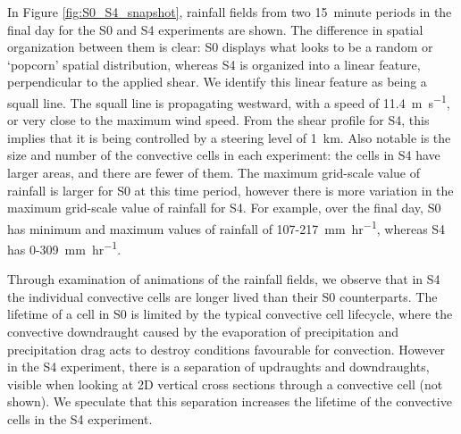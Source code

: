 \documentclass[11pt,a4paper]{article}
\begin{document}
%
In Figure \ref{fig:S0_S4_snapshot}, rainfall fields from two \SI{15}{minute} periods in the final day for the S0 and S4 experiments are shown. The difference in spatial organization between them is clear: S0 displays what looks to be a random or `popcorn' spatial distribution, whereas S4 is organized into a linear feature, perpendicular to the applied shear. We identify this linear feature as being a squall line. The squall line is propagating westward, with a speed of \SI{11.4}{m.s^{-1}}, or very close to the maximum wind speed. From the shear profile for S4, this implies that it is being controlled by a steering level of \SI{1}{km}. Also notable is the size and number of the convective cells in each experiment: the cells in S4 have larger areas, and there are fewer of them. The maximum grid-scale value of rainfall is larger for S0 at this time period, however there is more variation in the maximum grid-scale value of rainfall for S4. For example, over the final day, S0 has minimum and maximum values of rainfall of \SI{107}{}-\SI{217}{mm.hr^{-1}}, whereas S4 has \SI{0}{}-\SI{309}{mm.hr^{-1}}.

Through examination of animations of the rainfall fields, we observe that in S4 the individual convective cells are longer lived than their S0 counterparts. The lifetime of a cell in S0 is limited by the typical convective cell lifecycle, where the convective downdraught caused by the evaporation of precipitation and precipitation drag acts to destroy conditions favourable for convection. However in the S4 experiment, there is a separation of updraughts and downdraughts, visible when looking at 2D vertical cross sections through a convective cell (not shown). We speculate that this separation increases the lifetime of the convective cells in the S4 experiment.
\end{document}
